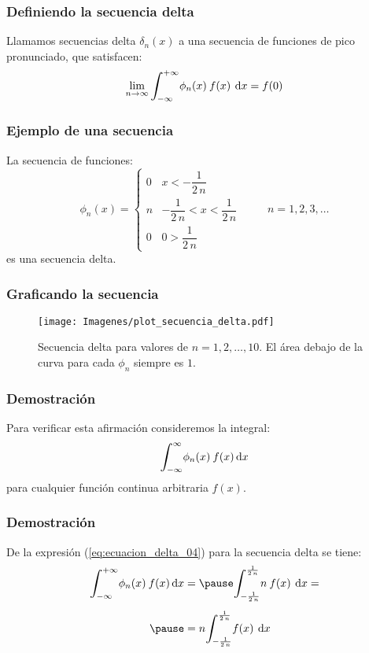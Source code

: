 \documentclass[12pt]{beamer}
\begin{document}
\begin{frame}
\frametitle{Definiendo la secuencia delta}
Llamamos secuencias delta $\delta_{n} (x)$ a una secuencia de funciones de pico pronunciado, que satisfacen:
\pause
\begin{align*}
\lim_{n \to \infty} \scaleint{6ex}_{\bs -\infty}^{+ \infty} \phi_{n} (x) \: f (x) \: \dd{x} =  f (0)
\end{align*}
\end{frame}

\begin{frame}
\frametitle{Ejemplo de una secuencia}
La secuencia de funciones:
\pause
\begin{equation}
\phi_{n} (x) = \begin{cases}
0 & x < - \dfrac{1}{2 \, n} \\
n & - \dfrac{1}{2 \, n} < x < \dfrac{1}{2 \, n} \\
0 & 0 >  \dfrac{1}{2 \, n}
\end{cases}
\hspace{1cm} n = 1, 2, 3, \ldots
\label{eq:ecuacion_delta_04}
\end{equation}
es una secuencia delta.
\end{frame}

\begin{frame}
\frametitle{Graficando la secuencia}
\begin{figure}[H]
    \centering
    \texttt{[image: Imagenes/plot\_secuencia\_delta.pdf]}
    \caption{Secuencia delta para valores de $n = 1, 2, \ldots, 10$. El área debajo de la curva para cada $\phi_{n}$ siempre es $1$.}
    \label{fig:secuncia_delta_01}
\end{figure}
\end{frame}

\begin{frame}
\frametitle{Demostración}
Para verificar esta afirmación consideremos la integral:
\pause
\begin{align*}
\scaleint{6ex}_{\bs -\infty}^{\infty} \phi_{n} (x) \: f (x) \dd{x}
\end{align*}
para cualquier función continua arbitraria $f (x)$.
\end{frame}

\begin{frame}
\frametitle{Demostración}
De la expresión (\ref{eq:ecuacion_delta_04}) para la secuencia delta se tiene:
\pause
\begin{eqnarray*}
\scaleint{6ex}_{\bs -\infty}^{+ \infty} \phi_{n} (x) \: f (x) \dd{x} &=  \pause \scaleint{6ex}_{\bs -\frac{1}{2 \, n}}^{\frac{1}{2 \, n}} n \: f (x) \: \dd{x} = \\[0.5em] \pause
&= n \scaleint{6ex}_{\bs -\frac{1}{2 \, n}}^{\frac{1}{2 \, n}} f (x) \:  \dd{x}
\end{eqnarray*}
\end{frame}
\end{document}
